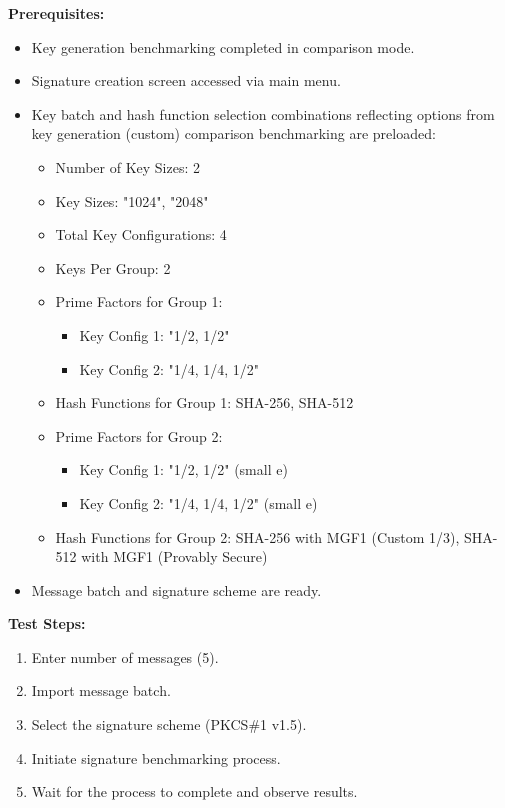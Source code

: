 \documentclass[]{final_report}
\theoremstyle{definition}
\begin{document}
\textbf{Prerequisites:}
\begin{itemize}
    \item Key generation benchmarking completed in comparison mode.
    \item Signature creation screen accessed via main menu.
    \item Key batch and hash function selection combinations  reflecting options from key generation (custom) comparison benchmarking are preloaded:
    \begin{itemize}
           \item Number of Key Sizes: 2
    \item Key Sizes: "1024", "2048"
    \item Total Key Configurations: 4
    \item Keys Per Group: 2
    \item Prime Factors for Group 1: 
        \begin{itemize}
            \item Key Config 1: "1/2, 1/2"
            \item Key Config 2: "1/4, 1/4, 1/2"
        \end{itemize}
    \item Hash Functions for Group 1: SHA-256, SHA-512
    \item Prime Factors for Group 2: 
        \begin{itemize}
            \item Key Config 1: "1/2, 1/2" (small e)
            \item Key Config 2: "1/4, 1/4, 1/2" (small e)
        \end{itemize}
    \item Hash Functions for Group 2: SHA-256 with MGF1 (Custom 1/3), SHA-512 with MGF1 (Provably Secure)
        \end{itemize}
    \item Message batch and signature scheme are ready.
\end{itemize}

\textbf{Test Steps:}
\begin{enumerate}
    \item Enter number of messages (5).
    \item Import message batch.
    \item Select the signature scheme (PKCS\#1 v1.5).
    \item Initiate signature benchmarking process.
    \item Wait for the process to complete and observe results.
\end{enumerate}
\end{document}
